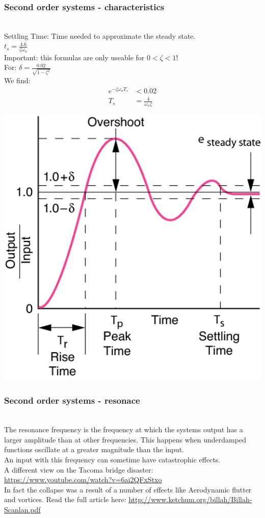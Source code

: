 \begin{frame}
\frametitle{Second order systems - characteristics}
\\ Settling Time: Time needed to approximate the steady state.
\\ $t_s = \frac{4.6}{\zeta\omega_n}$
\pause
\\ Important: this formulas are only useable for $0<\zeta<1$!
\vspace{0.12cm}
\pause
\\ For: $\delta = \frac{0.02}{\sqrt{1-\zeta^2}}$
\vspace{0.12cm}
\pause
\\ We find:
\vspace{-0.6cm}
\begin{align*}
 e^{-\zeta\omega_n T_s} &< 0.02
\\ T_s &= \frac{4}{\omega_n\zeta}
\end{align*}
\vspace{-1cm}

\includegraphics[width=0.3\linewidth]{Afbeelding7}

\end{frame}

\begin{frame}
\frametitle{Second order systems - resonace}
\\ The resonance frequency is the frequency at which the systems output has a larger amplitude than at other frequencies. This happens when underdamped functions oscillate at a greater magnitude than the input.
\vspace{0.35cm}
\pause
\\ An input with this frequency can sometime have catastrophic effects.
\vspace{0.35cm}
\pause
\\ A different view on the Tacoma bridge disaster: \url{https://www.youtube.com/watch?v=6ai2QFxStxo}
\vspace{0.35cm}
\\ In fact the collapse was a result of a number of effects like Aerodynamic flutter and vortices. Read the full article here: \url{http://www.ketchum.org/billah/Billah-Scanlan.pdf}
\end{frame}

